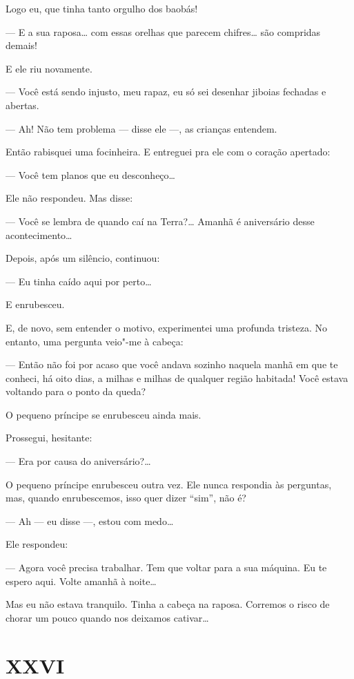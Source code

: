 \begin{Parallel}[p]{}{}
{Logo eu, que tinha tanto orgulho dos baobás!

--- E a sua raposa\ldots{} com essas orelhas que parecem chifres\ldots{} são
compridas demais!

E ele riu novamente.

--- Você está sendo injusto, meu rapaz, eu só sei desenhar jiboias
fechadas e abertas.

--- Ah! Não tem problema --- disse ele ---, as crianças entendem.

Então rabisquei uma focinheira. E entreguei pra ele com o coração
apertado:

--- Você tem planos que eu desconheço\ldots{}

Ele não respondeu. Mas disse:

--- Você se lembra de quando caí na Terra?\ldots{} Amanhã é aniversário desse
acontecimento\ldots{}

Depois, após um silêncio, continuou:

--- Eu tinha caído aqui por perto\ldots{}

E enrubesceu.

E, de novo, sem entender o motivo, experimentei uma profunda tristeza.
No entanto, uma pergunta veio"-me à cabeça:

--- Então não foi por acaso que você andava sozinho naquela manhã em que
te conheci, há oito dias, a milhas e milhas de qualquer região habitada!
Você estava voltando para o ponto da queda?

O pequeno príncipe se enrubesceu ainda mais.

Prossegui, hesitante:

--- Era por causa do aniversário?\ldots{}

O pequeno príncipe enrubesceu outra vez. Ele nunca respondia às
perguntas, mas, quando enrubescemos, isso quer dizer ``sim'', não é?

--- Ah --- eu disse ---, estou com medo\ldots{}

Ele respondeu:

--- Agora você precisa trabalhar. Tem que voltar para a sua máquina. Eu te
espero aqui. Volte amanhã à noite\ldots{}

Mas eu não estava tranquilo. Tinha a cabeça na raposa. Corremos o risco
de chorar um pouco quando nos deixamos cativar\ldots{}

\section{XXVI}

}
\end{Parallel}
